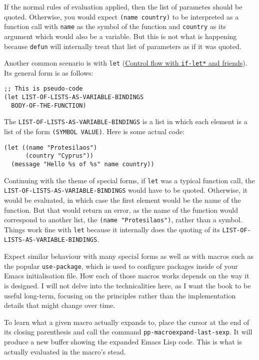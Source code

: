 \documentclass[11pt]{ctexart}
\begin{document}
If the normal rules of evaluation applied, then the list of parametes should be quoted. Otherwise, you would expect \texttt{(name country)} to be interpreted as a function call with \texttt{name} as the symbol of the function and \texttt{country} as its argument which would also be a variable. But this is not what is happening because \texttt{defun} will internally treat that list of parameters as if it was quoted.

Another common scenario is with \texttt{let} (\hyperref[sec:org8aa5d4d]{Control flow with \texttt{if-let*} and friends}). Its general form is as follows:

\begin{verbatim}
;; This is pseudo-code
(let LIST-OF-LISTS-AS-VARIABLE-BINDINGS
  BODY-OF-THE-FUNCTION)
\end{verbatim}

The \texttt{LIST-OF-LISTS-AS-VARIABLE-BINDINGS} is a list in which each element is a list of the form \texttt{(SYMBOL VALUE)}. Here is some actual code:

\begin{verbatim}
(let ((name "Protesilaos")
      (country "Cyprus"))
  (message "Hello %s of %s" name country))
\end{verbatim}

Continuing with the theme of special forms, if \texttt{let} was a typical function call, the \texttt{LIST-OF-LISTS-AS-VARIABLE-BINDINGS} would have to be quoted. Otherwise, it would be evaluated, in which case the first element would be the name of the function. But that would return an error, as the name of the function would correspond to another list, the \texttt{(name "Protesilaos")}, rather than a symbol. Things work fine with \texttt{let} because it internally does the quoting of its \texttt{LIST-OF-LISTS-AS-VARIABLE-BINDINGS}.

Expect similar behaviour with many special forms as well as with macros such as the popular \texttt{use-package}, which is used to configure packages inside of your Emacs initialisation file. How each of those macros works depends on the way it is designed. I will not delve into the technicalities here, as I want the book to be useful long-term, focusing on the principles rather than the implementation details that might change over time.

To learn what a given macro actually expands to, place the cursor at the end of its closing parenthesis and call the command \texttt{pp-macroexpand-last-sexp}. It will produce a new buffer showing the expanded Emacs Lisp code. This is what is actually evaluated in the macro's stead.
\end{document}
